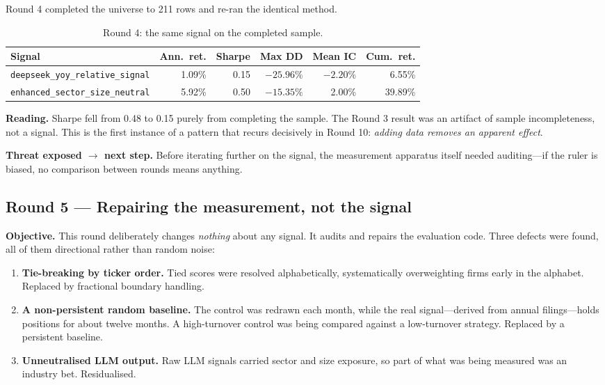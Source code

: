 \documentclass[11pt]{article}
\newcommand{\sig}[1]{\texttt{#1}}
\begin{document}
Round 4 completed the universe to 211 rows and re-ran the identical method.

\begin{table}[H]
\centering\small
\caption{Round 4: the same signal on the completed sample.}
\begin{tabular}{l r r r r r}
\toprule
\textbf{Signal} & \textbf{Ann.\ ret.} & \textbf{Sharpe} & \textbf{Max DD} & \textbf{Mean IC} & \textbf{Cum.\ ret.} \\
\midrule
\sig{deepseek\_yoy\_relative\_signal} & 1.09\% & 0.15 & $-25.96\%$ & $-2.20\%$ & 6.55\% \\
\sig{enhanced\_sector\_size\_neutral} & 5.92\% & 0.50 & $-15.35\%$ & 2.00\% & 39.89\% \\
\bottomrule
\end{tabular}
\end{table}

\textbf{Reading.} Sharpe fell from 0.48 to 0.15 purely from completing the sample. The
Round 3 result was an artifact of sample incompleteness, not a signal. This is the first
instance of a pattern that recurs decisively in Round 10: \emph{adding data removes an
apparent effect}.

\textbf{Threat exposed $\rightarrow$ next step.} Before iterating further on the signal, the
measurement apparatus itself needed auditing---if the ruler is biased, no comparison between
rounds means anything.

\subsection{Round 5 --- Repairing the measurement, not the signal}

\textbf{Objective.} This round deliberately changes \emph{nothing} about any signal. It
audits and repairs the evaluation code. Three defects were found, all of them
directional rather than random noise:

\begin{enumerate}[leftmargin=1.6em,itemsep=0.2em]
  \item \textbf{Tie-breaking by ticker order.} Tied scores were resolved alphabetically,
        systematically overweighting firms early in the alphabet. Replaced by fractional
        boundary handling.
  \item \textbf{A non-persistent random baseline.} The control was redrawn each month,
        while the real signal---derived from annual filings---holds positions for about
        twelve months. A high-turnover control was being compared against a low-turnover
        strategy. Replaced by a persistent baseline.
  \item \textbf{Unneutralised LLM output.} Raw LLM signals carried sector and size
        exposure, so part of what was being measured was an industry bet. Residualised.
\end{enumerate}
\end{document}
